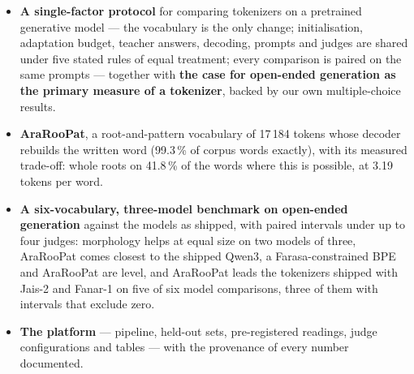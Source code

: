 \begin{itemize}
  \item \textbf{A single-factor protocol} for comparing tokenizers on a pretrained generative model --- the vocabulary
  is the only change; initialisation, adaptation budget, teacher answers, decoding, prompts and judges are shared under
  five stated rules of equal treatment; every comparison is paired on the same prompts --- together with \textbf{the
  case for open-ended generation as the primary measure of a tokenizer}, backed by our own multiple-choice results.
  \item \textbf{AraRooPat}, a root-and-pattern vocabulary of 17\,184 tokens whose decoder rebuilds the written word
  (99.3\,\% of corpus words exactly), with its measured trade-off: whole roots on 41.8\,\% of the words where this is
  possible, at 3.19 tokens per word.
  \item \textbf{A six-vocabulary, three-model benchmark on open-ended generation} against the models as shipped, with
  paired intervals under up to four judges: morphology helps at equal size on two models of three, AraRooPat comes
  closest to the shipped Qwen3, a Farasa-constrained BPE and AraRooPat are level, and AraRooPat leads the tokenizers
  shipped with Jais-2 and Fanar-1 on five of six model comparisons, three of them with intervals that exclude zero.
  \item \textbf{The platform} --- pipeline, held-out sets, pre-registered readings, judge configurations and tables ---
  with the provenance of every number documented.
\end{itemize}
